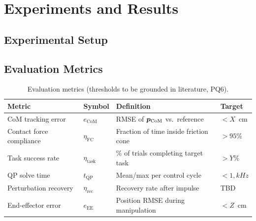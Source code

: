 
\chapter{Experiments and Results}
\label{chap:experiments}


\lipsum[31]

\section{Experimental Setup}
\label{sec:exp-setup}


\lipsum[32]

\section{Evaluation Metrics}
\label{sec:metrics}


\begin{table}[htb]
  \centering
  \caption{Evaluation metrics (thresholds to be grounded in literature, PQ6).}
  \label{tab:metrics}
  \begin{tabularx}{\linewidth}{llXl}
    \toprule
    \textbf{Metric} & \textbf{Symbol} & \textbf{Definition} & \textbf{Target} \\
    \midrule
    CoM tracking error       & $e_{\mathrm{CoM}}$   & RMSE of $\bm{p}_{\mathrm{CoM}}$ vs.\ reference & $< X$~cm \\
    Contact force compliance  & $\eta_{\mathrm{FC}}$ & Fraction of time inside friction cone & $> 95\%$ \\
    Task success rate         & $\eta_{\mathrm{task}}$ & \% of trials completing target task & $> Y\%$ \\
    QP solve time             & $t_{\mathrm{QP}}$    & Mean/max per control cycle & $<1,kHz$ \\
    Perturbation recovery     & $\eta_{\mathrm{rec}}$ & Recovery rate after impulse & TBD \\
    End-effector error        & $e_{\mathrm{EE}}$    & Position RMSE during manipulation & $< Z$~cm \\
    \bottomrule
  \end{tabularx}
\end{table}

